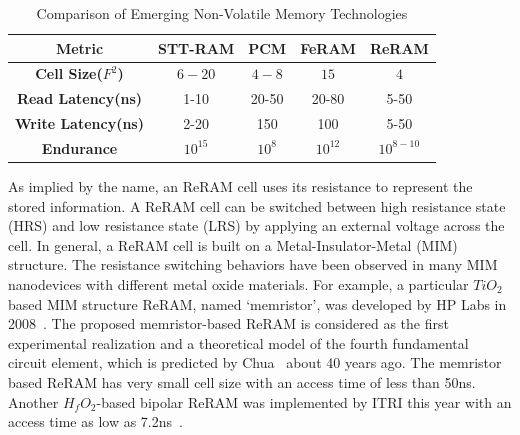 \begin{table}[!tb]
  \centering
  \scriptsize
    \scriptsize
  \caption{Comparison of Emerging Non-Volatile Memory Technologies}\label{table:compare}
  \vspace{-5pt}
  \begin{tabular}{|c|cccc|}
    \hline
    \textbf{Metric} & \textbf{STT-RAM} & \textbf{PCM}    & \textbf{FeRAM} & \textbf{ReRAM}
    \\\hline
    \textbf{Cell Size($F^2$)} & $6-20$ & $4-8$ & $15$ & $4$\\\hline
    \textbf{Read Latency(ns)} &  1-10 & 20-50 & 20-80 & 5-50\\\hline
    \textbf{Write Latency(ns)} & 2-20& 150& 100& 5-50\\\hline
    \textbf{Endurance} &  $10^{15}$ & $10^8$ & $10^{12}$ & $10^{8-10}$\\\hline
  \end{tabular}
  \vspace{-10pt}
\end{table}


As implied by the name, an ReRAM cell uses its resistance to represent the stored information. A ReRAM cell can be switched between high resistance state (HRS) and low resistance state (LRS) by applying an external voltage across the cell.
In general, a ReRAM cell is built on a Metal-Insulator-Metal (MIM) structure. The resistance switching behaviors have been observed in many MIM nanodevices with different metal oxide materials. For example, a particular $TiO_2$ based MIM structure ReRAM, named `memristor', was developed by HP Labs in 2008~\cite{memristor:missing}. The proposed memristor-based ReRAM is considered as the first experimental realization and a theoretical model of the fourth fundamental circuit element, which is predicted by Chua~\cite{memristor:chua} about 40 years ago. The memristor based ReRAM has very small cell size with an access time of less than 50ns. %
Another $H_fO_2$-based bipolar ReRAM was implemented by ITRI this year with an access time as low as 7.2ns~\cite{ReRAM_ISSCC2011_Sheu}.

